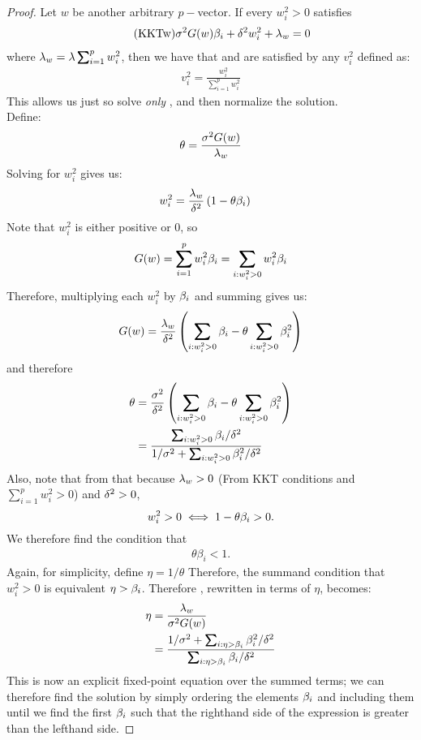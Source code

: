 \documentclass[12pt,leqno,letterpaper]{article}
\begin{document}
\begin{proof}
Let $w$ be another arbitrary $p-$vector.  If every $w_i^2>0$ satisfies
\begin{align}
\label{kktw}\tag{KKTw}  \sigma^2 G(w) \beta_i + \delta^2 w_i^2  + \lambda_w =0
\end{align}
where $ \gl_w = \gl \sum_{i=1}^p w_i^2$, then we have that 
 and  are satisfied by any $v_i^2$ defined as:
\begin{align}
v_i^2  = \frac{w_i^2}{\sum_{i=1}^p w_i^2}
\end{align}
This allows us just so solve \textit{only} , and then normalize the solution.\\
Define:
\begin{align*}
\theta = \frac{\sigma^2 G(w)}{\lambda_w}
\end{align*}
Solving  for $w_i^2$ gives us:
\begin{align}\label{solw}
w_i^2 &= \frac{\lambda_w}{\delta^2}\left(1-\theta \beta_i\right)
\end{align}
Note that $w_i^2$ is either positive or $0$, so 
\begin{align}
G(w) = \sum_{i=1}^p w_i^2 \gb_i = \sum_{i:w_i^2>0} w_i^2 \gb_i
\end{align}
Therefore, multiplying each $w_i^2$ by $\beta_i$ and summing gives us:
\begin{align}
G(w) = \frac{\gl_w}{\gd^2}\paren{ \sum_{i:w_i^2>0} \gb_i - \theta \sum_{i:w_i^2>0} \gb_i^2}
\end{align}
and therefore
\begin{align}
\begin{aligned}
\theta &= \frac{\gs^2}{\gd^2}\paren{ \sum_{i:w_i^2>0} \gb_i - \theta \sum_{i:w_i^2>0} \gb_i^2}\\
&=\frac{\sum_{i:w_i^2>0} \gb_i/\gd^2}{1/\gs^2 + \sum_{i:w_i^2>0} \gb_i^2/\gd^2}\label{soltheta}
\end{aligned}
\end{align}
Also, note that from  that because $\lambda_w>0$ (From KKT conditions and $\sum_{i=1}^p w_i^2>0$) and $\delta^2>0$, 
$$w_i^2>0 \iff 1-\theta \beta_i>0.$$
We therefore find the condition that 
\begin{align}
\theta \beta_i < 1.
\end{align}
Again, for simplicity, define $\eta= 1/\theta$
Therefore, the summand condition that $w_i^2>0$ is equivalent $\eta > \beta_i$.  Therefore , rewritten in terms of $\eta$, becomes:
\begin{align}
\eta &=\frac{\gl_w}{\gs^2G(w)}\\
&= \frac{1/\gs^2 + \sum_{i:\eta>\gb_i} \gb_i^2 / \gd^2}{\sum_{i:\eta>\gb_i}\gb_i / \gd^2} \label{etasol}
\end{align}
This is now an explicit fixed-point equation over the summed terms; we can therefore find the solution by simply ordering the elements $\beta_i$ and including them until we find the first $\beta_i$  such that the righthand side of the expression is greater than the lefthand side.


\end{proof}
\end{document}
